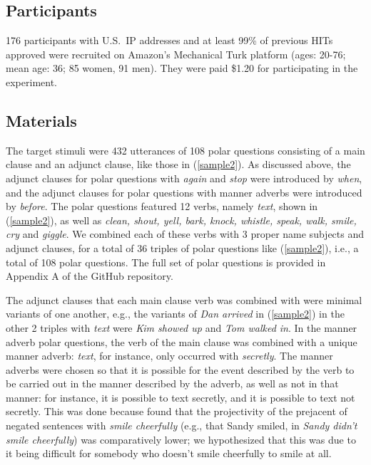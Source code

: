 \documentclass[a4paper,12pt]{article}
\newcommand{\6}{\mbox{$[\hspace*{-.6mm}[$}}
\newcommand{\9}{\mbox{$]\hspace*{-.6mm}]$}}
\begin{document}
\subsection{Participants}

176 participants with U.S.\ IP addresses and at least 99\% of previous HITs approved were recruited on Amazon's Mechanical Turk platform (ages: 20-76; mean age: 36; 85 women, 91 men). They were paid \$1.20 for participating in the experiment. 

\subsection{Materials}

The target stimuli were 432 utterances of 108 polar questions consisting of a main clause and an adjunct clause, like those in (\ref{sample2}). As discussed above, the adjunct clauses for polar questions with {\em again} and {\em stop} were introduced by {\em when}, and the adjunct clauses for polar questions with manner adverbs were introduced by {\em before}. The polar questions featured 12 verbs, namely {\em text}, shown in (\ref{sample2}), as well as {\em clean, shout, yell, bark, knock, whistle, speak, walk, smile, cry} and {\em giggle}. We combined each of these verbs with 3 proper name subjects and adjunct clauses, for a total of 36 triples of polar questions like (\ref{sample2}), i.e., a total of 108 polar questions. The full set of polar questions is provided in Appendix A of the GitHub repository.

The adjunct clauses that each main clause verb was combined with were minimal variants of one another, e.g., the variants of {\em Dan arrived} in (\ref{sample2}) in the other 2 triples with {\em text} were {\em Kim showed up} and {\em Tom walked in}. In the manner adverb polar questions, the verb of the main clause was combined with a unique manner adverb: {\em text}, for instance, only occurred with {\em secretly}. The manner adverbs were chosen so that it is possible for the event described by the verb to be carried out in the manner described by the adverb, as well as not in that manner: for instance, it is possible to text secretly, and it is possible to text not secretly. This was done because \citet{stevens-etal2017} found that the projectivity of the prejacent of negated sentences with {\em smile cheerfully} (e.g., that Sandy smiled, in {\em Sandy didn't smile cheerfully}) was comparatively lower; we hypothesized that this was due to it being difficult for somebody who doesn't smile cheerfully to smile at all.
\end{document}
